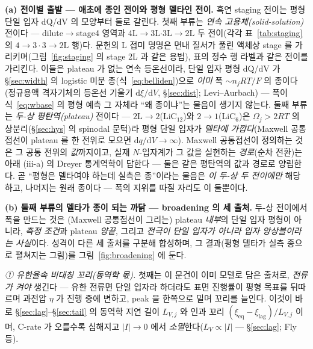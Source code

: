 \documentclass[11pt,a4paper]{article}
\newcommand{\dd}{\mathrm{d}}
\newcommand{\eq}{\mathrm{eq}}
\begin{document}
\textbf{(a) 전이별 출발 — 애초에 종인 전이와 평형 델타인 전이.} 흑연 staging 전이는 평형 단일 입자 dQ/dV 의 모양부터
둘로 갈린다. 첫째 부류는 \emph{연속 고용체(solid-solution)} 전이다 — dilute$\to$stage4 영역과
4L$\to$3L$\cdot$3L$\to$2L 두 전이(각각 표~\ref{tab:staging} 의 $4\!\to\!3\cdot3\!\to\!2\mathrm L$ 행)다. 문헌의 L 접미 명명은 면내 질서가 풀린
액체상 stage 를 가리키며(그림~\ref{fig:staging} 의 stage 2L 과 같은 용법), 표의 정수 행 라벨과 같은 전이를
가리킨다. 이들은 plateau 가 없는 연속 등온선이라\cite{rsc2021}, 단일 입자 평형 dQ/dV 가 \S\ref{sec:width} 의 logistic 미분
종(식~\eqref{eq:belliden})으로 \emph{이미} 폭 $\sim n_jRT/F$ 의 종이다(정규용액 격자기체의 등온선 기울기
$\dd\xi/\dd V$, \S\ref{sec:dist}; Levi--Aurbach\cite{leviaurbach1999}) — 폭이 식~\eqref{eq:wbase} 의 평형
예측 그 자체라 ``왜 종이냐''는 물음이 생기지 않는다. 둘째 부류는 \emph{두-상 평탄역(plateau)} 전이다 —
$2\mathrm L\!\to\!2$($\mathrm{LiC_{12}}$)와 $2\!\to\!1$($\mathrm{LiC_6}$)은 $\Omega_j>2RT$ 의 상분리(\S\ref{sec:hys}
의 spinodal 문턱)라 평형 단일 입자가 \emph{델타에 가깝다}(Maxwell 공통접선이 plateau 를 한 전위로 모으면
$\dd q/\dd V\!\to\!\infty$). Maxwell 공통접선이 정의하는 것은 그 공통 전위의 \emph{값}까지이고, 실재 $N$-입자계가
그 값을 실현하는 \emph{경로}(순차 전환)는 아래 (iii-a) 의 Dreyer 통계역학이 답한다 — 둘은 같은 평탄역의 값과
경로로 양립한다. 곧 ``평형은 델타여야 하는데 실측은 종''이라는 물음은 \emph{이 두-상 두 전이에만} 해당하고,
나머지는 원래 종이다 — 폭의 지위를 따질 자리도 이 둘뿐이다.

\textbf{(b) 둘째 부류의 델타가 종이 되는 까닭 — broadening 의 세 출처.} 두-상 전이에서 폭을 만드는 것은 (Maxwell
공통접선이 그리는) plateau \emph{내부}의 단일 입자 평형이 아니라, \emph{측정 조건}과 plateau \emph{양끝}, 그리고
\emph{전극이 단일 입자가 아니라 입자 앙상블이라는 사실}이다. 성격이 다른 세 출처를 구분해 합성하며, 그 결과(평형 델타가
실측 종으로 펼쳐지는 그림)를 그림~\ref{fig:broadening} 에 둔다.

\emph{① 유한율속 비대칭 꼬리(동역학 몫).} 첫째는 이 문건이 이미 모델로 담은 출처로, \emph{전류가 켜야} 생긴다 — 유한
전류면 단일 입자라 하더라도 표면 진행률이 평형 목표를 뒤따르며 과전압 $\eta$ 가 진행 중에 변하고, peak 을 한쪽으로
밀며 꼬리를 늘인다. 이것이 바로 \S\ref{sec:lag}--\S\ref{sec:tail} 의 동역학 지연 길이 $L_{V,j}$ 와 인과 꼬리
$(\xi_\eq-\xi_\mathrm{lag})/L_{V,j}$ 이며, C-rate 가 오를수록 심해지고 $|I|\!\to\!0$ 에서
\emph{소멸}한다($L_V\propto|I|$ — \S\ref{sec:lag}; Fly 등\cite{fly2020}).
\end{document}

